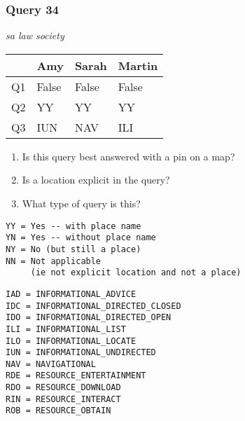 \begin{frame}[fragile]
\frametitle{Query 34}
\vspace{1em}

\emph{sa law society}

\vfill

\begin{table}
  \centering
  \begin{tabular}{ l l l l }
    & \textbf{Amy} & \textbf{Sarah} & \textbf{Martin}\\
    \toprule
    Q1 & False & False & False\\
Q2 & YY & YY & YY\\
Q3 & IUN & NAV & ILI\\
    \bottomrule
  \end{tabular}
\end{table}

\vfill

\tiny{

\begin{enumerate}
\item Is this query best answered with a pin on a map?
\item Is a location explicit in the query?
\item What type of query is this?
\end{enumerate}

\vfill

\begin{multicols}{2}
\begin{verbatim}
YY = Yes -- with place name
YN = Yes -- without place name
NY = No (but still a place)
NN = Not applicable 
     (ie not explicit location and not a place)
\end{verbatim}

\columnbreak
\begin{verbatim}
IAD = INFORMATIONAL_ADVICE
IDC = INFORMATIONAL_DIRECTED_CLOSED
IDO = INFORMATIONAL_DIRECTED_OPEN
ILI = INFORMATIONAL_LIST
ILO = INFORMATIONAL_LOCATE
IUN = INFORMATIONAL_UNDIRECTED
NAV = NAVIGATIONAL
RDE = RESOURCE_ENTERTAINMENT
RDO = RESOURCE_DOWNLOAD
RIN = RESOURCE_INTERACT
ROB = RESOURCE_OBTAIN
\end{verbatim}
\end{multicols}
}

\end{frame}


